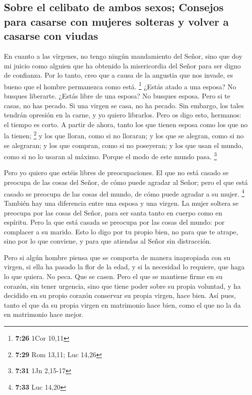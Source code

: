\hypertarget{sobre-el-celibato-de-ambos-sexos-consejos-para-casarse-con-mujeres-solteras-y-volver-a-casarse-con-viudas}{%
\subsection{Sobre el celibato de ambos sexos; Consejos para casarse con
mujeres solteras y volver a casarse con
viudas}\label{sobre-el-celibato-de-ambos-sexos-consejos-para-casarse-con-mujeres-solteras-y-volver-a-casarse-con-viudas}}

 En cuanto a las vírgenes, no tengo ningún mandamiento
del Señor, sino que doy mi juicio como alguien que ha obtenido la
misericordia del Señor para ser digno de confianza.  Por
lo tanto, creo que a causa de la angustia que nos invade, es bueno que
el hombre permanezca como está. \footnote{\textbf{7:26} 1Cor 10,11}
 ¿Estás atado a una esposa? No busques liberarte. ¿Estás
libre de una esposa? No busques esposa.  Pero si te
casas, no has pecado. Si una virgen se casa, no ha pecado. Sin embargo,
los tales tendrán opresión en la carne, y yo quiero librarlos.
 Pero os digo esto, hermanos: el tiempo es corto. A
partir de ahora, tanto los que tienen esposa como los que no la tienen;
\footnote{\textbf{7:29} Rom 13,11; Luc 14,26}  y los que
lloran, como si no lloraran; y los que se alegran, como si no se
alegraran; y los que compran, como si no poseyeran;  y
los que usan el mundo, como si no lo usaran al máximo. Porque el modo de
este mundo pasa. \footnote{\textbf{7:31} 1Jn 2,15-17}

 Pero yo quiero que estéis libres de preocupaciones. El
que no está casado se preocupa de las cosas del Señor, de cómo puede
agradar al Señor;  pero el que está casado se preocupa de
las cosas del mundo, de cómo puede agradar a su mujer. \footnote{\textbf{7:33}
  Luc 14,20}  También hay una diferencia entre una esposa
y una virgen. La mujer soltera se preocupa por las cosas del Señor, para
ser santa tanto en cuerpo como en espíritu. Pero la que está casada se
preocupa por las cosas del mundo: por complacer a su marido.
 Esto lo digo por tu propio bien, no para que te atrape,
sino por lo que conviene, y para que atiendas al Señor sin distracción.

 Pero si algún hombre piensa que se comporta de manera
inapropiada con su virgen, si ella ha pasado la flor de la edad, y si la
necesidad lo requiere, que haga lo que quiera. No peca. Que se casen.
 Pero el que se mantiene firme en su corazón, sin tener
urgencia, sino que tiene poder sobre su propia voluntad, y ha decidido
en su propio corazón conservar su propia virgen, hace bien.
 Así pues, tanto el que da su propia virgen en matrimonio
hace bien, como el que no la da en matrimonio hace mejor.


